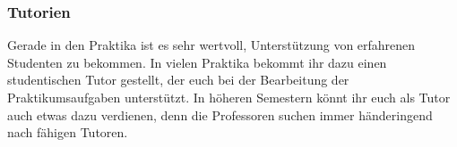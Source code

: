 \subsubsection{Tutorien}
Gerade in den Praktika ist es sehr wertvoll, Unterstützung von 
erfahrenen Studenten zu bekommen. In vielen Praktika bekommt ihr 
dazu einen studentischen Tutor gestellt, der euch bei der Bearbeitung 
der Praktikumsaufgaben unterstützt. \doublebreak
In höheren Semestern könnt ihr euch als Tutor auch etwas dazu 
verdienen, denn die Professoren suchen immer händeringend nach 
fähigen Tutoren. 